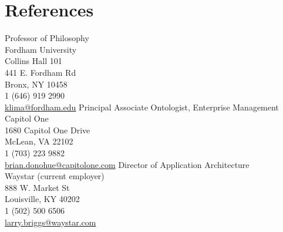 \section{References}
\begin{cvcolumns}
  {Professor of Philosophy 
  \\ Fordham University 
  \\ Collins Hall 101
  \\ 441 E. Fordham Rd
  \\ Bronx, NY 10458
  \\ 1 (646) 919 2990 
  \\ \href{mailto:klima@fordham.edu}{klima@fordham.edu}
}
  {Principal Associate Ontologist, Enterprise Management
  \\ Capitol One
  \\ 1680 Capitol One Drive
  \\ McLean, VA 22102
  \\ 1 (703) 223 9882
  \\ \href{mailto:brian.donohue@capitolone.com}{brian.donohue@capitolone.com}}
{Director of Application Architecture
	\\ Waystar (current employer)
	\\ 888 W. Market St
	\\ Louisville, KY 40202
	\\ 1 (502) 500 6506 
	\\ \href{mailto:larry.briggs@waystar.com}{larry.briggs@waystar.com}}
\end{cvcolumns}